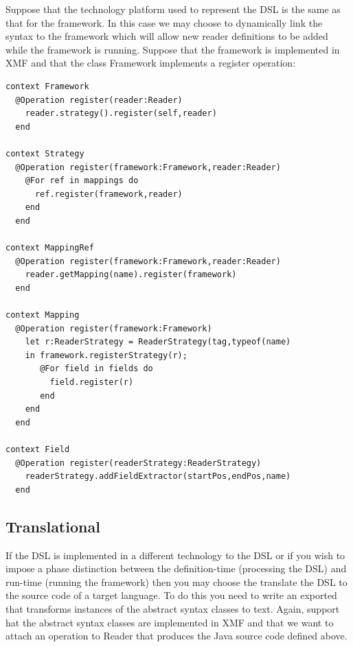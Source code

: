Suppose that the technology platform used to represent the DSL is the 
same as that for the framework. In this case we may choose to dynamically 
link the syntax to the framework which will allow new reader definitions 
to be added while the framework is running. Suppose that the framework is 
implemented in XMF and that the class Framework implements a register 
operation:
\begin{lstlisting}
context Framework
  @Operation register(reader:Reader) 
    reader.strategy().register(self,reader)
  end

context Strategy
  @Operation register(framework:Framework,reader:Reader)
    @For ref in mappings do
      ref.register(framework,reader)
    end
  end

context MappingRef
  @Operation register(framework:Framework,reader:Reader)
    reader.getMapping(name).register(framework)
  end

context Mapping
  @Operation register(framework:Framework)
    let r:ReaderStrategy = ReaderStrategy(tag,typeof(name)
    in framework.registerStrategy(r);
       @For field in fields do
         field.register(r)
       end
    end
  end

context Field
  @Operation register(readerStrategy:ReaderStrategy)
    readerStrategy.addFieldExtractor(startPos,endPos,name)
  end
\end{lstlisting}

\subsection{Translational}

If the DSL is implemented in a different technology to the DSL 
or if you wish to impose a phase distinction between the definition-time 
(processing the DSL) and run-time (running the framework) then you may 
choose the translate the DSL to the source code of a target language. 
To do this you need to write an exported that transforms instances of 
the abstract syntax classes to text. Again, support hat the abstract 
syntax classes are implemented in XMF and that we want to attach an 
operation to Reader that produces the Java source code defined above.

